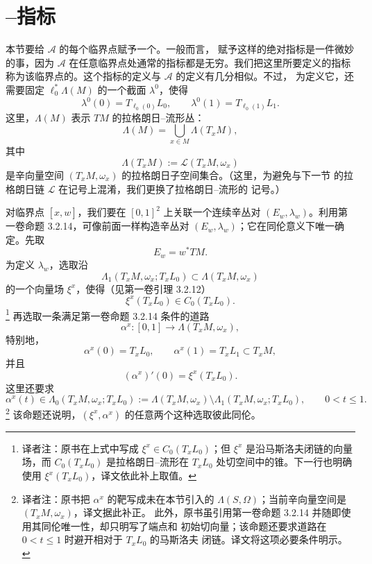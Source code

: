 \section{\personMaslov{}--\personMorse{}指标}
\label{sec:maslov-morse-index}

本节要给 $\mathcal A$ 的每个临界点赋予一个\termAbsoluteMorseIndex{}。一般而言，
赋予这样的绝对指标是一件微妙的事，因为 $\mathcal A$ 在任意临界点处通常的\personMorse{}指标都是无穷。我们把这里所要定义的\personMorse{}指标称为该临界点的\termMaslovMorseIndex{}。这个指标的定义与 $\mathcal A$ 的定义有几分相似。不过，
为定义它，还需要固定 $\ell_0^*\Lambda(M)$ 的一个截面 $\lambda^0$，使得
\[
  \lambda^0(0)=T_{\ell_0(0)}L_0,
  \qquad
  \lambda^0(1)=T_{\ell_0(1)}L_1.
\]
这里，$\Lambda(M)$ 表示 $TM$ 的拉格朗日--\personGrassmann{}流形丛：
\[
  \Lambda(M)=\bigcup_{x\in M}\Lambda(T_xM),
\]
其中
\[
  \Lambda(T_xM):=\mathcal L(T_xM,\omega_x)
\]
是辛向量空间 $(T_xM,\omega_x)$ 的拉格朗日子空间集合。（这里，为避免与下一节
的拉格朗日链 $\mathcal L$ 在记号上混淆，我们更换了拉格朗日--\personGrassmann{}流形的
记号。）

对临界点 $[\widehat x,w]$，我们要在 $[0,1]^2$ 上关联一个连续辛丛对
$(E_w,\lambda_w)$。利用第一卷命题 3.2.14，可像前面一样构造辛丛对
$(E_w,\lambda_w)$；它在同伦意义下唯一确定。先取
\[
  E_w=w^*TM.
\]
为定义 $\lambda_w$，选取沿
\[
  \Lambda_1(T_xM,\omega_x;T_xL_0)
  \subset\Lambda(T_xM,\omega_x)
\]
的一个向量场 $\xi^x$，使得（见第一卷引理 3.2.12）
\[
  \xi^x(T_xL_0)\in C_0(T_xL_0).
\]
\footnote{译者注：原书在上式中写成 $\xi^x\in C_0(T_xL_0)$；但 $\xi^x$
是沿马斯洛夫闭链的向量场，而 $C_0(T_xL_0)$ 是拉格朗日--\personGrassmann{}流形在
$T_xL_0$ 处切空间中的锥。下一行也明确使用 $\xi^x(T_xL_0)$，译文依此补上取值。}
再选取一条满足第一卷命题 3.2.14 条件的道路
\[
  \alpha^x:[0,1]\longrightarrow\Lambda(T_xM,\omega_x),
\]
特别地，
\[
  \alpha^x(0)=T_xL_0,
  \qquad
  \alpha^x(1)=T_xL_1\subset T_xM,
\]
并且
\[
  (\alpha^x)'(0)=\xi^x(T_xL_0).
\]
这里还要求
\[
  \alpha^x(t)\in
  \Lambda_0(T_xM,\omega_x;T_xL_0)
  :=\Lambda(T_xM,\omega_x)
    \setminus\Lambda_1(T_xM,\omega_x;T_xL_0),
  \qquad 0<t\leq1.
\]
\footnote{译者注：原书把 $\alpha^x$ 的靶写成未在本节引入的
$\Lambda(S,\Omega)$；当前辛向量空间是 $(T_xM,\omega_x)$，译文据此补正。
此外，原书虽引用第一卷命题 3.2.14 并随即使用其同伦唯一性，却只明写了端点和
初始切向量；该命题还要求道路在 $0<t\leq1$ 时避开相对于 $T_xL_0$ 的马斯洛夫
闭链。译文将这项必要条件明示。}
该命题还说明，$(\xi^x,\alpha^x)$ 的任意两个这种选取彼此同伦。

